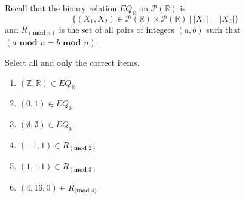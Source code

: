 
Recall that the binary relation $EQ_{\mathbb{R}}$ on $\mathcal{P}(\mathbb{R})$ is
\[
\{ (X_1, X_2 ) \in\mathcal{P}(\mathbb{R})  \times \mathcal{P}(\mathbb{R}) ~|~ |X_1| = |X_2| \}
\]
and $R_{(\textbf{mod } n)}$ is the set of all pairs of integers $(a, b)$ 
such that $(a \textbf{ mod } n = b \textbf{ mod } n)$.

Select all and only the correct items.
\begin{enumerate}
\item $(\mathbb{Z}, \mathbb{R}) \in EQ_{\mathbb{R}}$
\item $(0,1) \in EQ_{\mathbb{R}}$
\item $(\emptyset, \emptyset) \in EQ_{\mathbb{R}}$
\item $(-1,1) \in R_{(\textbf{mod } 2)}$
\item $(1,-1) \in R_{(\textbf{mod } 3)}$ 
\item $(4, 16, 0) \in R_{\textbf{(mod } 4)}$ 
\end{enumerate}